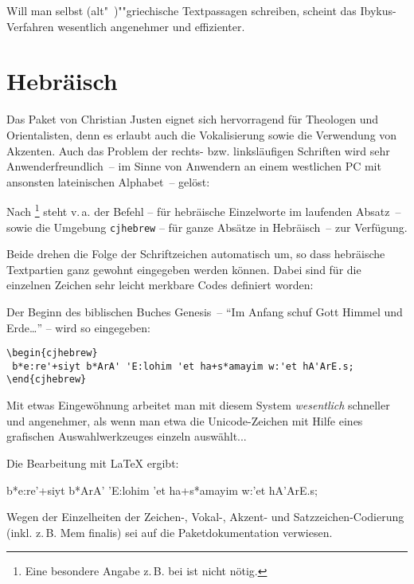 Will man selbst (alt"~)""griechische Textpassagen schreiben, scheint das Ibykus-Verfahren
wesentlich angenehmer und effizienter.


\section{Hebräisch}

Das Paket  von Christian Justen eignet sich hervorragend für
Theologen und Orientalisten, denn es erlaubt auch die Vokalisierung sowie die Verwendung
von Akzenten. Auch das Problem der rechts- bzw. linksläufigen Schriften wird sehr
Anwenderfreundlich~-- im Sinne von Anwendern an einem westlichen PC mit ansonsten
lateinischen Alphabet~-- gelöst:

Nach %
\footnote{Eine besondere Angabe z.\,B. bei  ist nicht nötig.}
steht v.\,a. der Befehl 
-- für hebräische Einzelworte im laufenden Absatz~-- sowie die
Umgebung \lstinline/cjhebrew/
-- für ganze Absätze in Hebräisch~-- zur Verfügung.

Beide drehen die Folge der Schriftzeichen automatisch um, so dass hebräische Textpartien
ganz gewohnt eingegeben werden können. Dabei sind für die einzelnen Zeichen sehr leicht
merkbare Codes definiert worden:

Der Beginn des biblischen Buches Genesis~-- \enquote{Im Anfang schuf Gott Himmel und Erde\dots} --
wird so eingegeben:

\begin{lstlisting}
\begin{cjhebrew}
 b*e:re'+siyt b*ArA' 'E:lohim 'et ha+s*amayim w:'et hA'ArE.s;
\end{cjhebrew}
\end{lstlisting}

Mit etwas Eingewöhnung arbeitet man mit diesem System \emph{wesentlich} schneller und
angenehmer, als wenn man etwa die Unicode-Zeichen mit Hilfe eines grafischen Auswahlwerkzeuges
einzeln auswählt...

Die Bearbeitung mit \LaTeX{} ergibt:

\begin{cjhebrew}
 b*e:re'+siyt b*ArA' 'E:lohim 'et ha+s*amayim w:'et hA'ArE.s;
\end{cjhebrew}

Wegen der Einzelheiten der Zeichen-, Vokal-, Akzent- und Satzzeichen-Codierung (inkl. z.\,B.
Mem finalis) sei auf die Paketdokumentation verwiesen.

